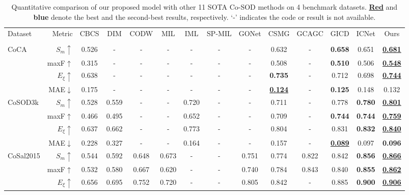 \documentclass[10pt,twocolumn,letterpaper]{article}
\def\blu#1{\textbf{\color{blue} #1}} %
\def\red#1{\textbf{\color{red}\underline{#1}}} %
\begin{document}
\begin{table*}[t]
  \centering
  \footnotesize
  \renewcommand{\arraystretch}{1.0}
  \renewcommand{\tabcolsep}{2.2mm}
 \caption{Quantitative comparison of our proposed model with other 11 SOTA Co-SOD methods on 4 benchmark datasets. \red{Red} and \blu{blue} denote the best and the second-best results, respectively. `-' indicates the code or result is not available.}
  \begin{tabular}{lr|ccccccccccc|c}
  \hline

    Dataset
    & Metric
    & CBCS  & DIM & CODW & MIL & IML  & SP-MIL & GONet & CSMG & GCAGC & GICD & ICNet & Ours \\
    &
    & \cite{fu2013cluster} &\cite{zhang2015cosaliency} & \cite{zhang2015co}   & \cite{zhang2015self} & \cite{ren2020co}& \cite{zhang2016co} & \cite{hsu2018unsupervised} & \cite{zhang2019co} & \cite{zhang2020adaptive} &\cite{zhang2020gicd} &\cite{jin2020icnet} &\\ \hline
  \multirow{4}{*}{CoCA}
    & $S_m\uparrow$    &0.526 &- &- &-	&-	&-	&-	&0.632	&-	&\blu{0.658}	&0.651	&\red{0.681}\\
    & maxF$\uparrow$  &0.315 &-	&-	&-	&-	&-	&-	&0.508	&-	&\blu{0.510}	&0.506	&\red{0.548}\\
    & $E_\xi\uparrow$  &0.638	&-	&-	&-	&-	&-	&-	&\blu{0.735}	&-	&0.712	&0.698	&\red{0.744}\\
  \cite{zhang2020gicd}& MAE$\downarrow$ &0.175	&-	&-	&-	&-	&-	&-	&\red{0.124}	&-	&\blu{0.125}	&0.148	&0.132\\
     \hline
  \multirow{4}{*}{CoSOD3k}
    & $S_m\uparrow$  &0.528	&0.559	&-	&-	&0.720	&-	&-	&0.711	&-	&0.778	&\blu{0.780}	&\red{0.801} \\
    & maxF$\uparrow$  &0.466 &0.495	&-	&-	&0.652	&-	&-	&0.709	&-	&\blu{0.744}	&\blu{0.744}	&\red{0.759}\\
    & $E_\xi\uparrow$ &0.637 &0.662	&-	&-	&0.773	&-	&-	&0.804	&-	&0.831	&\blu{0.832}	&\red{0.840}\\
  \cite{fan2020taking}& MAE$\downarrow$ &0.228 &0.327 &- &-	&0.164	&-	&-	&0.157	&-	&\red{0.089}	&0.097	&\blu{0.096}\\
     \hline
  \multirow{4}{*}{CoSal2015}
    & $S_m\uparrow$   &0.544 &0.592	&0.648 &0.673	&-	&-	&0.751	&0.774	&0.822	&0.842	&\blu{0.856} &\red{0.866} \\
    & maxF$\uparrow$  &0.532 &0.580	&0.667 &0.620	&-	&-	&0.740	&0.784	&0.843	&0.840	&\blu{0.855} &\red{0.862}\\
    & $E_\xi\uparrow$ &0.656 &0.695	&0.752 &0.720	&-	&-	&0.805	&0.842	&-	&0.885	&\blu{0.900} &\red{0.906} \\

\end{tabular}
\end{table*}
\end{document}
